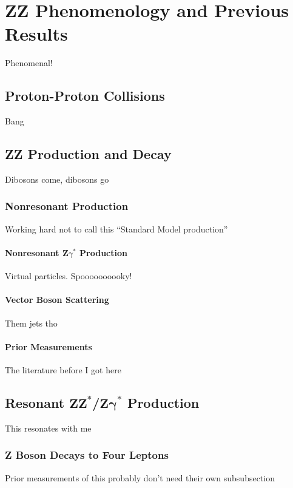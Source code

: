 \chapter{ZZ Phenomenology and Previous Results}
Phenomenal!

\section{Proton-Proton Collisions}
\label{sec:pp}
Bang



\section{ZZ Production and Decay}
Dibosons come, dibosons go

\subsection{Nonresonant Production}
Working hard not to call this ``Standard Model production''

\subsubsection{Nonresonant
               \texorpdfstring{$\mathbf{Z}\gamma^\ast$}{Zgamma*}
               Production}
Virtual particles. Spoooooooooky!

\subsubsection{Vector Boson Scattering}
Them jets tho

\subsubsection{Prior Measurements}
The literature before I got here


\section{Resonant
         \texorpdfstring{$\mathbf{ZZ}^\ast$/$\mathbf{Z\gamma}^\ast$}
         {ZZ*/Zgamma*}
         Production
         }
This resonates with me

\subsection{Z Boson Decays to Four Leptons}
Prior measurements of this probably don't need their own subsubsection



